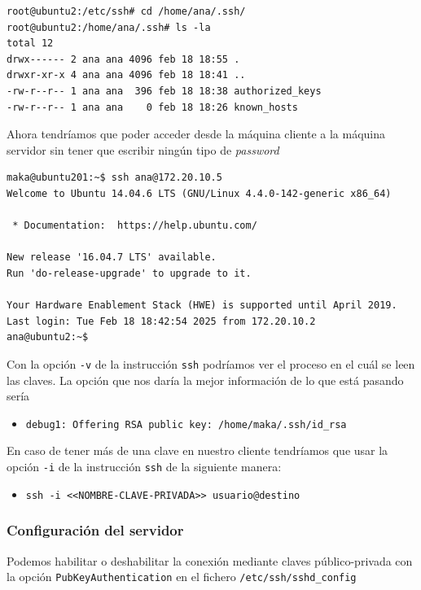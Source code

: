 \documentclass[11pt]{article}
\begin{document}
\begin{verbatim}
root@ubuntu2:/etc/ssh# cd /home/ana/.ssh/
root@ubuntu2:/home/ana/.ssh# ls -la
total 12
drwx------ 2 ana ana 4096 feb 18 18:55 .
drwxr-xr-x 4 ana ana 4096 feb 18 18:41 ..
-rw-r--r-- 1 ana ana  396 feb 18 18:38 authorized_keys
-rw-r--r-- 1 ana ana    0 feb 18 18:26 known_hosts
\end{verbatim}

Ahora tendríamos que poder acceder desde la máquina cliente a la máquina servidor sin tener que escribir ningún tipo de \emph{password}
\begin{verbatim}
maka@ubuntu201:~$ ssh ana@172.20.10.5
Welcome to Ubuntu 14.04.6 LTS (GNU/Linux 4.4.0-142-generic x86_64)

 * Documentation:  https://help.ubuntu.com/

New release '16.04.7 LTS' available.
Run 'do-release-upgrade' to upgrade to it.

Your Hardware Enablement Stack (HWE) is supported until April 2019.
Last login: Tue Feb 18 18:42:54 2025 from 172.20.10.2
ana@ubuntu2:~$ 
\end{verbatim}

Con la opción \texttt{-v} de la instrucción \texttt{ssh} podríamos ver el proceso en el cuál se leen las claves. La opción que nos daría la mejor información de lo que está pasando sería
\begin{itemize}
\item \texttt{debug1: Offering RSA public key: /home/maka/.ssh/id\_rsa}
\end{itemize}

En caso de tener más de una clave en nuestro cliente tendríamos que usar la opción \texttt{-i} de la instrucción \texttt{ssh} de la siguiente manera:
\begin{itemize}
\item \texttt{ssh -i <{}<{}NOMBRE-CLAVE-PRIVADA>{}>{} usuario@destino}
\end{itemize}
\subsubsection{Configuración del servidor}
\label{sec:orgb79d404}
Podemos habilitar o deshabilitar la conexión mediante claves público-privada con la opción \texttt{PubKeyAuthentication} en el fichero \texttt{/etc/ssh/sshd\_config}
\end{document}
